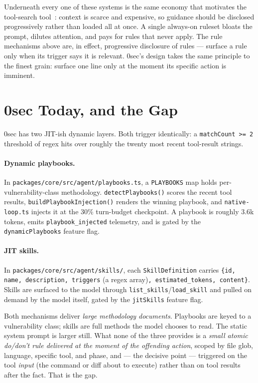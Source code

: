 \documentclass[11pt]{article}
\begin{document}
Underneath every one of these systems is the same economy that motivates the
tool-search tool~\cite{toolsearch}: context is scarce and expensive, so
guidance should be disclosed progressively rather than loaded all at once. A
single always-on ruleset bloats the prompt, dilutes attention, and pays for
rules that never apply. The rule mechanisms above are, in effect, progressive
disclosure of rules --- surface a rule only when its trigger says it is relevant.
0sec's design takes the same principle to the finest grain: surface one line only
at the moment its specific action is imminent.

\section{0sec Today, and the Gap}
\label{sec:gap}

0sec has two JIT-ish dynamic layers. Both trigger identically: a
\texttt{matchCount >= 2} threshold of regex hits over roughly the twenty most
recent tool-result strings.

\paragraph{Dynamic playbooks.} In
\texttt{packages/core/src/agent/playbooks.ts}, a \texttt{PLAYBOOKS} map holds
per-vulnerability-class methodology. \texttt{detectPlaybooks()} scores the recent
tool results, \texttt{buildPlaybookInjection()} renders the winning playbook, and
\texttt{native-loop.ts} injects it at the 30\% turn-budget checkpoint. A playbook
is roughly 3.6k tokens, emits \texttt{playbook\_injected} telemetry, and is gated
by the \texttt{dynamicPlaybooks} feature flag.

\paragraph{JIT skills.} In \texttt{packages/core/src/agent/skills/}, each
\texttt{SkillDefinition} carries \texttt{\{id, name, description, triggers}
(a regex array)\texttt{, estimated\_tokens, content\}}. Skills are surfaced to the
model through \texttt{list\_skills}/\texttt{load\_skill} and pulled on demand by
the model itself, gated by the \texttt{jitSkills} feature flag.

Both mechanisms deliver \emph{large methodology documents}. Playbooks are keyed
to a vulnerability class; skills are full methods the model chooses to read. The
static system prompt is larger still. What none of the three provides is a
\emph{small atomic do/don't rule delivered at the moment of the offending
action}, scoped by file glob, language, specific tool, and phase, and --- the
decisive point --- triggered on the tool \emph{input} (the command or diff about
to execute) rather than on tool results after the fact. That is the gap.
\end{document}
